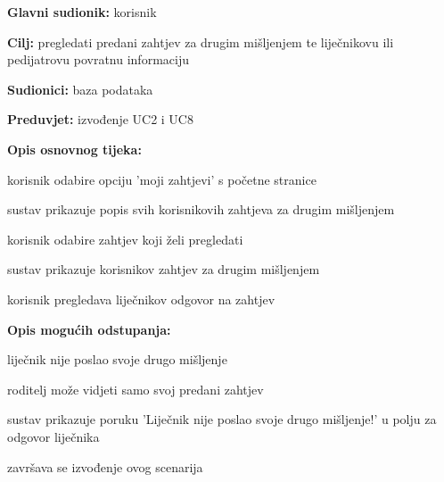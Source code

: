                     \noindent {}
					\begin{packed_item}
	
						\item \textbf{Glavni sudionik: }korisnik
						\item  \textbf{Cilj:} pregledati predani zahtjev za drugim mišljenjem te liječnikovu ili pedijatrovu povratnu informaciju 
						\item  \textbf{Sudionici:} baza podataka
						\item  \textbf{Preduvjet:} izvođenje UC2 i UC8
						\item  \textbf{Opis osnovnog tijeka:}
						
						\item[] \begin{packed_enum}
	
							\item korisnik odabire opciju 'moji zahtjevi' s početne stranice
							\item sustav prikazuje popis svih korisnikovih zahtjeva za drugim mišljenjem
							\item korisnik odabire zahtjev koji želi pregledati
                            \item sustav prikazuje korisnikov zahtjev za drugim mišljenjem
                            \item korisnik pregledava liječnikov odgovor na zahtjev

						\end{packed_enum}
						
						\item  \textbf{Opis mogućih odstupanja:}
						
						\item[] \begin{packed_item}
	
							\item[5.a] liječnik nije poslao svoje drugo mišljenje
							\item[] \begin{packed_enum}
								\item roditelj može vidjeti samo svoj predani zahtjev
								\item sustav prikazuje poruku 'Liječnik nije poslao svoje drugo mišljenje!' u polju za odgovor liječnika
								\item završava se izvođenje ovog scenarija 
							\end{packed_enum}
							
						\end{packed_item}
					\end{packed_item}

